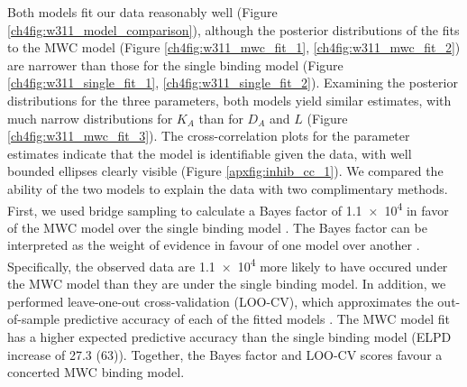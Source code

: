 Both models fit our data reasonably well (Figure \ref{ch4fig:w311_model_comparison}), although the posterior distributions of the fits to the MWC model (Figure \ref{ch4fig:w311_mwc_fit_1}, \ref{ch4fig:w311_mwc_fit_2}) are narrower than those for the single binding model (Figure \ref{ch4fig:w311_single_fit_1}, \ref{ch4fig:w311_single_fit_2}).
Examining the posterior distributions for the three parameters, both models yield similar estimates, with much narrow distributions for $K_A$ than for $D_A$ and $L$ (Figure \ref{ch4fig:w311_mwc_fit_3}).
The cross-correlation plots for the parameter estimates indicate that the model is identifiable given the data, with well bounded ellipses clearly visible (Figure \ref{apxfig:inhib_cc_1}).
We compared the ability of the two models to explain the data with two complimentary methods.
First, we used bridge sampling to calculate a Bayes factor of \num{1.1e4} in favor of the MWC model over the single binding model \cite{gronau_bridgesampling_2020}.
The Bayes factor can be interpreted as the weight of evidence in favour of one model over another \cite{wagenmakers_practical_2007}.
Specifically, the observed data are \num{1.1e4} more likely to have occured under the MWC model than they are under the single binding model.
In addition, we performed leave-one-out cross-validation (LOO-CV), which approximates the out-of-sample predictive accuracy of each of the fitted models \cite{vehtari_practical_2017}.
The MWC model fit has a higher expected predictive accuracy than the single binding model (ELPD increase of \num{27.3 (63)}).
Together, the Bayes factor and LOO-CV scores favour a concerted MWC binding model.

